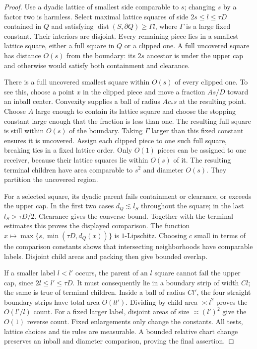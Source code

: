 \documentclass[11pt]{article}
\numberwithin{equation}{section}
\begin{document}
\begin{proof}
Use a dyadic lattice of smallest side comparable to $s$; changing $s$ by
a factor two is harmless. Select maximal lattice squares of side
$2s\le l\le\tau D$ contained in $Q$ and satisfying
$\operatorname{dist}(S,\partial Q)\ge\Gamma l$, where $\Gamma$ is a
large fixed constant. Their interiors are disjoint. Every remaining
piece lies in a smallest lattice square, either a full square in $Q$ or
a clipped one. A full uncovered square has distance $O(s)$ from the
boundary: its $2s$ ancestor is under the upper cap and otherwise would
satisfy both containment and clearance.

There is a full uncovered smallest square within $O(s)$ of every clipped
one. To see this, choose a point $x$ in the clipped piece and move a
fraction $As/D$ toward an inball center. Convexity supplies a ball of
radius $Ac_*s$ at the resulting point. Choose $A$ large enough to contain
its lattice square and choose the stopping constant large enough that
the fraction is less than one. The resulting full square is still within
$O(s)$ of the boundary. Taking $\Gamma$ larger than this fixed constant
ensures it is uncovered. Assign each clipped piece to one such full
square, breaking ties in a fixed lattice order. Only $O(1)$ pieces can be
assigned to one receiver, because their lattice squares lie within
$O(s)$ of it. The resulting terminal children have area comparable to
$s^2$ and diameter $O(s)$. They partition the uncovered region.

For a selected square, its dyadic parent fails containment or clearance,
or exceeds the upper cap. In the first two cases $d_Q\lesssim l_S$
throughout the square; in the last $l_S>\tau D/2$. Clearance gives the
converse bound. Together with the terminal estimates this proves the
displayed comparison. The function
$x\mapsto\max\{s,\min(\tau D,d_Q(x))\}$ is $1$-Lipschitz. Choosing
$c$ small in terms of the comparison constants shows that intersecting
neighborhoods have comparable labels. Disjoint child areas and packing
then give bounded overlap.

If a smaller label $l<l'$ occurs, the parent of an $l$ square cannot fail
the upper cap, since $2l\le l'\le\tau D$. It must consequently lie in a
boundary strip of width $Cl$; the same is true of terminal children.
Inside a ball of radius $Cl'$, the four straight boundary strips have
total area $O(ll')$. Dividing by child area $\asymp l^2$ proves the
$O(l'/l)$ count. For a fixed larger label, disjoint areas of size
$\asymp(l')^2$ give the $O(1)$ reverse count. Fixed enlargements only
change the constants. All tests, lattice choices and tie rules are
measurable. A bounded relative chart change preserves an inball and
diameter comparison, proving the final assertion.
\end{proof}
\end{document}
